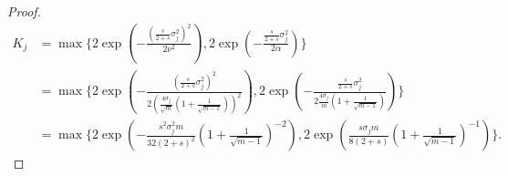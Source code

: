 \documentclass[10pt,a4paper]{amsart}
\begin{document}
\begin{proof}
	\begin{align*}
		K_j &= \max\{2\exp(-\frac{(\frac{s}{2+s}\sigma^2_j)^2}{2\nu^2}),2\exp(-\frac{\frac{s}{2+s}\sigma^2_j}{2\alpha}) \}\\
		&= \max\{2\exp(-\frac{(\frac{s}{2+s}\sigma^2_j)^2}{2(\frac{4\sigma_j}{\sqrt{m}}(1+\frac{1}{\sqrt{m-1}}))^2}), 2\exp(-\frac{\frac{s}{2+s}\sigma^2_j}{2 \frac{4\sigma_j}{m}(1+\frac{1}{\sqrt{m-1}})})\}\\
		&= \max\{2\exp(-\frac{s^2\sigma_j^2m}{32(2+s)^2}(1+\frac{1}{\sqrt{m-1}})^{-2}) , 2\exp(\frac{s\sigma_jm}{8(2+s)}(1+\frac{1}{\sqrt{m-1}})^{-1})\}. 
	\end{align*}
	
\end{proof}
\end{document}
